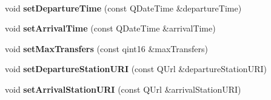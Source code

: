 \begin{DoxyCompactItemize}
$$\item 
\mbox{\label{classRouterEngine_1_1Planner_a4f6a6a4045e0fe51e2cb21b3e8108c83}} 
void {\bfseries set\+Departure\+Time} (const Q\+Date\+Time \&departure\+Time)
\item 
\mbox{\label{classRouterEngine_1_1Planner_a9cf4483fd3fdf2b35965574c86eea2ac}} 
void {\bfseries set\+Arrival\+Time} (const Q\+Date\+Time \&arrival\+Time)
\item 
\mbox{\label{classRouterEngine_1_1Planner_a66109426415a09e0558363aa498c5a17}} 
void {\bfseries set\+Max\+Transfers} (const qint16 \&max\+Transfers)
\item 
\mbox{\label{classRouterEngine_1_1Planner_a3f8722660a6e751de7c2d2540aba6eb0}} 
void {\bfseries set\+Departure\+Station\+U\+RI} (const Q\+Url \&departure\+Station\+U\+RI)
\item 
\mbox{\label{classRouterEngine_1_1Planner_ac9deb497ddeffd9bc50fe395f1f98713}} 
void {\bfseries set\+Arrival\+Station\+U\+RI} (const Q\+Url \&arrival\+Station\+U\+RI)
\end{DoxyCompactItemize}
